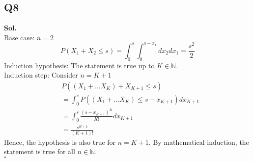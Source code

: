 \documentclass[12pt]{article}
\begin{document}
\subsection*{Q8}
\textbf{Sol.} \\
Base case: \(n = 2\)
\[
   P(X_1 + X_2 \leq  s) = \int_0^s \int_0^{s-x_1}  dx_2 dx_1 = \frac{s^2}{2}   
\] 
Induction hypothesis: The statement is true up to \(K \in \mathbb{N}\). \\ 
Induction step: Consider \(n = K +1\)
\begin{equation*}
    \begin{aligned}
        & P((X_1 + \dots X_K) + X_{K+1} \leq s)
        \\ &= \int_0^s P( (X_1 + \dots X_K) \leq  s- x_{K+1} ) dx_{K+1} 
        \\ &= \int_0^s \frac{(s-x_{K+1})^K}{K!} dx_{K+1} 
        \\ &= \frac{s^{K+1}}{(K+1)!}
    \end{aligned}
\end{equation*} 
Hence, the hypothesis is also true for \(n = K +1\). 
By mathematical induction, the statement is true for all \(n\in \mathbb{N}\). 
\\ \hspace{\textwidth}\(\square\)   
\end{document}
